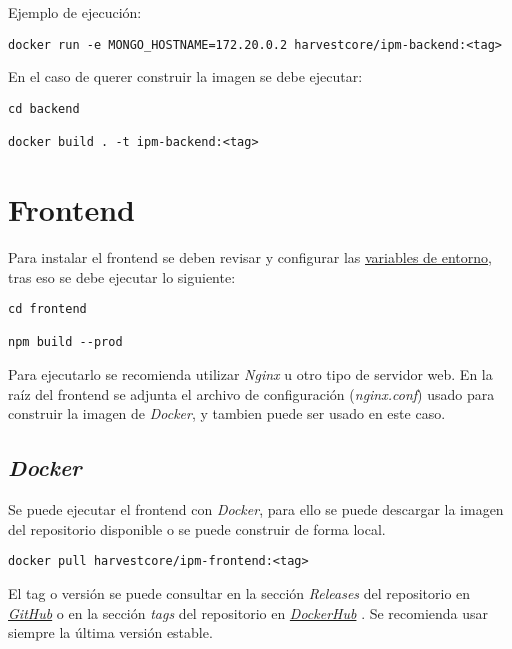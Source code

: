 Ejemplo de ejecución:

\begin{lstlisting}
docker run -e MONGO_HOSTNAME=172.20.0.2 harvestcore/ipm-backend:<tag>
\end{lstlisting}

En el caso de querer construir la imagen se debe ejecutar:

\begin{lstlisting}
cd backend

docker build . -t ipm-backend:<tag>
\end{lstlisting}





\section{Frontend}

Para instalar el frontend se deben revisar y configurar las \hyperref[sec:variables]{variables de entorno}, tras eso se debe ejecutar lo siguiente:

\begin{lstlisting}
cd frontend

npm build --prod
\end{lstlisting}

Para ejecutarlo se recomienda utilizar \textit{Nginx} u otro tipo de servidor web. En la raíz del frontend se adjunta el archivo de configuración (\textit{nginx.conf}) usado para construir la imagen de \textit{Docker}, y tambien puede ser usado en este caso.



\subsection{\textit{Docker}}

Se puede ejecutar el frontend con \textit{Docker}, para ello se puede descargar la imagen del repositorio disponible o se puede construir de forma local.

\begin{lstlisting}
docker pull harvestcore/ipm-frontend:<tag>
\end{lstlisting}

El tag o versión se puede consultar en la sección \textit{Releases} del repositorio en  \href{https://github.com/harvestcore/tfg/releases}{\textit{GitHub}} \cite{ipmanagerreleases} o en la sección \textit{tags} del repositorio en \href{https://hub.docker.com/r/harvestcore/ipm-frontend/tags}{\textit{DockerHub}} \cite{dockerhubtagfront}. Se recomienda usar siempre la última versión estable.

